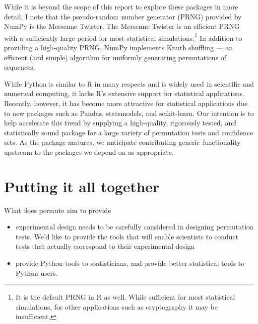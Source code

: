 While it is beyond the scope of this report to explore these packages in more
detail, I note that the pseudo-random number generator (PRNG) provided by NumPy
is the Mersenne Twister.  The Mersenne Twister is an efficient PRNG with a
sufficiently large period for most statistical simulations.\footnote{It is
the default PRNG in R as well.  While sufficient for most statistical simulations,
for other applications such as cryptography it may be insufficient.}  In
addition to providing a high-quality PRNG, NumPy implements Knuth shuffling ---
an efficient (and simple) algorithm for uniformly generating permutations of
sequences.

While Python is similar to R in many respects and is widely used in scientific
and numerical computing, it lacks R's extensive support for statistical
applications.  Recently, however, it has become more attractive for statistical
applications due to new packages such as Pandas, statsmodels, and
scikit-learn.  Our intention is to help accelerate this trend by supplying a
high-quality, rigorously tested, and statistically sound package for a large
variety of permutation tests and confidence sets. As the package matures, we
anticipate contributing generic functionality upstream to the packages we
depend on as appropriate.

\section{Putting it all together}

What does permute aim to provide
\begin{itemize}
\item experimental design needs to be carefully considered in designing
  permutation tests. We'd like to provide the tools that will enable scientists
  to conduct tests that actually correspond to their experimental design
\item provide Python tools to statisticians, and provide better statistical
  tools to Python users.
\end{itemize}
